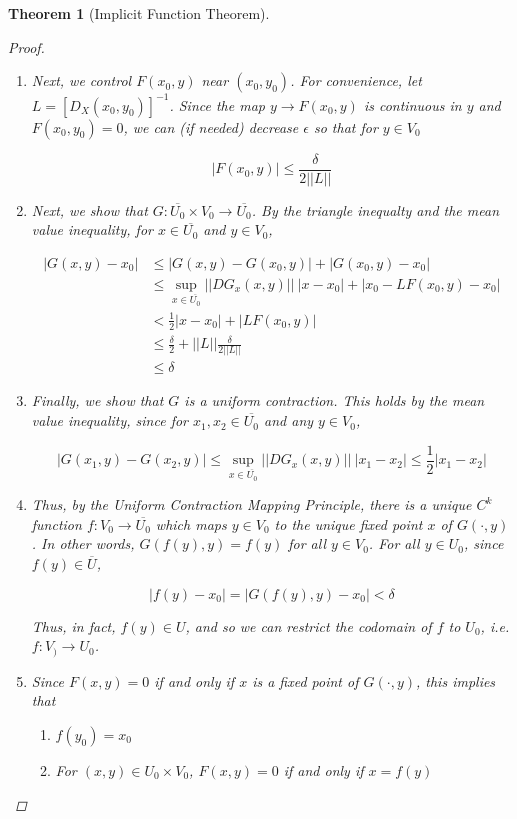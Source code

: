 \documentclass{article}
\newtheorem{theorem}{Theorem}[section]
\begin{document}
\begin{theorem}[Implicit Function Theorem]
\begin{proof}
\begin{enumerate}
\item Next, we control $F(x_0, y)$ near $(x_0, y_0)$. For convenience, let $L = [D_X(x_0, y_0)]^{-1}$. Since the map $y \rightarrow F(x_0, y)$ is continuous in $y$ and $F(x_0, y_0) = 0$, we can (if needed) decrease $\epsilon$ so that for $y \in V_0$

\[
|F(x_0, y)| \leq \frac{\delta}{2 ||L||}
\]

\item Next, we show that $G: \overline{U_0} \times V_0 \rightarrow \overline{U_0}$. By the triangle inequalty and the mean value inequality, for $x \in \overline{U_0}$ and $y \in V_0$,

\begin{align*}
|G(x, y) - x_0| &\leq |G(x, y) - G(x_0, y)| + |G(x_0, y) - x_0| \\
&\leq \sup_{x\in \overline{U_0}}||DG_x(x, y)||\:|x - x_0| + |x_0 - L F(x_0, y) - x_0 | \\
&< \frac{1}{2} |x - x_0| + |L F(x_0, y)| \\
&\leq \frac{\delta}{2} + ||L|| \frac{\delta}{2 ||L||} \\
&\leq \delta
\end{align*} 

\item Finally, we show that $G$ is a uniform contraction. This holds by the mean value inequality, since for $x_1, x_2 \in \overline{U_0}$ and any $y \in V_0$,

\[
|G(x_1, y) - G(x_2, y)| \leq \sup_{x\in \overline{U_0}}||DG_x(x, y)||\:|x_1 - x_2| \leq \frac{1}{2}|x_1 - x_2|
\]
\item Thus, by the Uniform Contraction Mapping Principle, there is a unique $C^k$ function $f: V_0 \rightarrow \overline{U_0}$ which maps $y \in V_0$ to the unique fixed point $x$ of $G(\cdot, y)$. In other words, $G(f(y),y) = f(y)$ for all $y \in V_0$. For all $y \in U_0$, since $f(y) \in \overline{U}$,

\[
|f(y) - x_0| = |G(f(y), y) - x_0| < \delta
\]

Thus, in fact, $f(y) \in U$, and so we can restrict the codomain of $f$ to $U_0$, i.e. $f: V_) \rightarrow U_0$.

\item Since $F(x, y) = 0$ if and only if $x$ is a fixed point of $G(\cdot, y)$, this implies that 
	\begin{enumerate}
	\item $f(y_0) = x_0$
	\item For $(x, y) \in U_0 \times V_0$, $F(x, y) = 0$ if and only if $x = f(y)$
	\end{enumerate}


\end{enumerate}
\end{proof}
\end{theorem}
\end{document}

